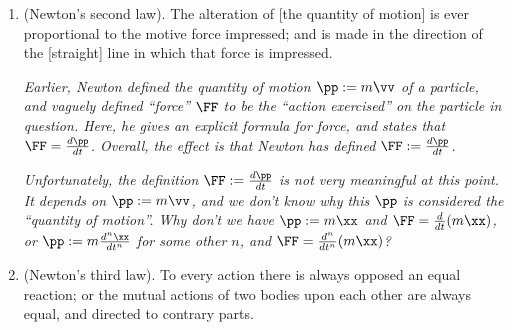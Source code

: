 \documentclass{article}
\begin{document}
\begin{enumerate}
	\textit{This should now sound a little more familiar, as we know from our presentation that a frame observes isolated particles to travel with constant velocity if and only if it is inertial. Recalling this, we see that Newton is asserting that absolute space is inertial, but using a different characterization of inertiality than we did to do so. (Our definition of inertiality involved the law of conservation of momentum. Since Newton hasn't stated that law yet, he is forced to use a characterization that doesn't involve it.)}
	
	\textit{Notice how relegating the law of conservation of momentum to later makes things unnecessarily confusing. If we knew that total momentum is conserved in isolated systems, then we would know why to expect an inertiality axiom like this first law in the first place. (Since momentum is dependent on velocity, the law of conservation of momentum can be biased if a frame isn't ``restful'' enough, and has a velocity that changes with time.) We would also know } why \textit{velocity, and not some other time-derivative of position, is singled out in Newton's inertiality condition. (Particles that change their velocity for no discernible reason are a sign that one is in a frame that perceives the law of conservation of momentum to be violated, i.e., that one is in a frame whose very motion is biasing the quantities of motion it perceives.)}
	
	\item (Newton's second law). The alteration of [the quantity of motion] is ever proportional to the motive force impressed; and is made in the direction of the [straight] line in which that force is impressed.
	
	\textit{Earlier, Newton defined the quantity of motion $\pp := m\vv$ of a particle, and vaguely defined ``force'' $\FF$ to be the ``action exercised'' on the particle in question. Here, he gives an explicit formula for force, and states that $\FF = \frac{d\pp}{dt}$. Overall, the effect is that Newton has defined $\FF := \frac{d\pp}{dt}$.}
	
	\textit{Unfortunately, the definition $\FF := \frac{d\pp}{dt}$ is not very meaningful at this point. It depends on $\pp := m\vv$, and we don't know why this $\pp$ is considered the ``quantity of motion''. Why don't we have $\pp := m\xx$ and $\FF = \frac{d}{dt}(m\xx)$, or $\pp := m\frac{d^n\xx}{dt^n}$ for some other $n$, and $\FF = \frac{d^n}{dt^n}(m\xx)$?}
	
	\item (Newton's third law). To every action there is always opposed an equal reaction; or the mutual actions of two bodies upon each other are always equal, and directed to contrary parts.
	

\end{enumerate}
\end{document}
